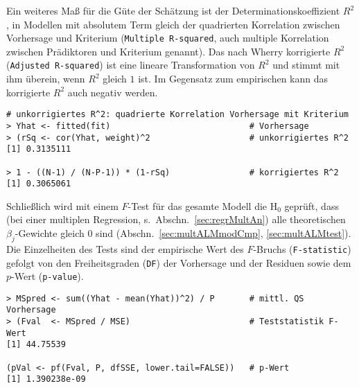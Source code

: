 Ein weiteres Maß für die Güte der Schätzung ist der Determinationskoeffizient $R^{2}$, in Modellen mit absolutem Term gleich der quadrierten Korrelation zwischen Vorhersage und Kriterium (\lstinline!Multiple R-squared!, auch multiple Korrelation zwischen Prädiktoren und Kriterium genannt). Das nach Wherry korrigierte $R^{2}$ (\lstinline!Adjusted R-squared!) ist eine lineare Transformation von $R^{2}$ und stimmt mit ihm überein, wenn $R^{2}$ gleich $1$ ist. Im Gegensatz zum empirischen kann das korrigierte $R^{2}$ auch negativ werden.
\begin{lstlisting}
# unkorrigiertes R^2: quadrierte Korrelation Vorhersage mit Kriterium
> Yhat <- fitted(fit)                            # Vorhersage
> (rSq <- cor(Yhat, weight)^2                    # unkorrigiertes R^2
[1] 0.3135111

> 1 - ((N-1) / (N-P-1)) * (1-rSq)                # korrigiertes R^2
[1] 0.3065061
\end{lstlisting}


Schließlich wird mit einem $F$-Test für das gesamte Modell die $\text{H}_{0}$ geprüft, dass (bei einer multiplen Regression, s.\ Abschn.\ \ref{sec:regrMultAn}) alle theoretischen $\beta_{j}$-Gewichte gleich $0$ sind (Abschn.\ \ref{sec:multALMmodCmp}, \ref{sec:multALMtest}). Die Einzelheiten des Tests sind der empirische Wert des $F$-Bruchs (\lstinline!F-statistic!) gefolgt von den Freiheitsgraden (\lstinline!DF!) der Vorhersage und der Residuen sowie dem $p$-Wert (\lstinline!p-value!).
\begin{lstlisting}
> MSpred <- sum((Yhat - mean(Yhat))^2) / P       # mittl. QS Vorhersage
> (Fval  <- MSpred / MSE)                        # Teststatistik F-Wert
[1] 44.75539

(pVal <- pf(Fval, P, dfSSE, lower.tail=FALSE))   # p-Wert
[1] 1.390238e-09
\end{lstlisting}

